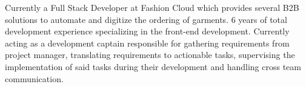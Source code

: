 

\begin{cvparagraph}

Currently a Full Stack Developer at Fashion Cloud which provides several B2B solutions to automate and digitize the ordering of garments. 6 years of total development experience specializing in the front-end development. Currently acting as a development captain responsible for gathering requirements from project manager, translating requirements to actionable tasks, supervising the implementation of said tasks during their development and handling cross team communication.
\end{cvparagraph}
